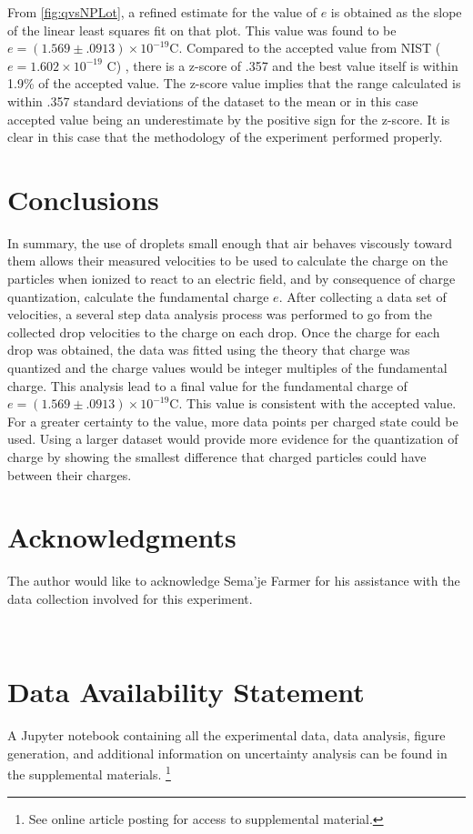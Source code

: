 \documentclass[rc]{physicsinprogress}
\begin{document}
From \ref{fig:qvsNPLot}, a refined estimate for the value of $e$ is obtained as the slope of the linear least squares fit on that plot. This value was found to be $e = (1.569 \pm .0913) \times 10^{-19} \text{C}$. Compared to the accepted value from NIST ($e = 1.602 \times 10^{-19}$ C) \cite{NIST_CODATA}, there is a z-score of .357 and the best value itself is within 1.9\% of the accepted value. The z-score value implies that the range calculated is within .357 standard deviations of the dataset to the mean or in this case accepted value being an underestimate by the positive sign for the z-score. It is clear in this case that the methodology of the experiment performed properly.




\section{Conclusions}
In summary, the use of droplets small enough that air behaves viscously toward them allows their measured velocities to be used to calculate the charge on the particles when ionized to react to an electric field, and by consequence of charge quantization, calculate the fundamental charge $e$. After collecting a data set of velocities, a several step data analysis process was performed to go from the collected drop velocities to the charge on each drop. Once the charge for each drop was obtained, the data was fitted using the theory that charge was quantized and the charge values would be integer multiples of the fundamental charge. This analysis lead to a final value for the fundamental charge of  $e = (1.569 \pm .0913) \times 10^{-19} \text{C}$. This value is consistent with the accepted value.
For a greater certainty to the value, more data points per charged state could be used. Using a larger dataset would provide more evidence for the quantization of charge by showing the smallest difference that charged particles could have between their charges. 


\section*{Acknowledgments}
The author would like to acknowledge Sema'je Farmer for his assistance with the data collection involved for this experiment. 

\ \\
\section*{Data Availability Statement}
A Jupyter notebook containing all the experimental data, data analysis, figure generation, and additional information on uncertainty analysis can be found in the supplemental materials. \footnote{See online article posting for access to supplemental material.}



\end{document}
